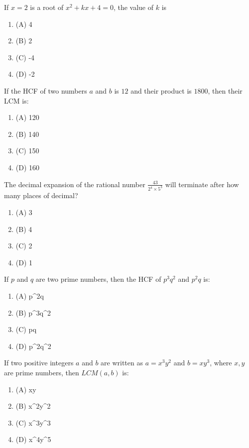\documentclass[12pt,a4paper]{exam}
\begin{document}
\begin{questions}
\question[1] If $x = 2$ is a root of $x^2 + kx + 4 = 0$, the value of $k$ is
\begin{enumerate}[label=(\Alph*)]
  \item (A) 4
  \item (B) 2
  \item (C) -4
  \item (D) -2
\end{enumerate}
\vspace{0.15cm}

\question[1] If the HCF of two numbers $a$ and $b$ is $12$ and their product is $1800$, then their LCM is:
\begin{enumerate}[label=(\Alph*)]
  \item (A) 120
  \item (B) 140
  \item (C) 150
  \item (D) 160
\end{enumerate}
\vspace{0.15cm}

\question[1] The decimal expansion of the rational number $\frac{43}{2^4 \times 5^3}$ will terminate after how many places of decimal?
\begin{enumerate}[label=(\Alph*)]
  \item (A) 3
  \item (B) 4
  \item (C) 2
  \item (D) 1
\end{enumerate}
\vspace{0.15cm}

\question[1] If $p$ and $q$ are two prime numbers, then the HCF of $p^3q^2$ and $p^2q$ is:
\begin{enumerate}[label=(\Alph*)]
  \item (A) p\textasciicircum{}2q
  \item (B) p\textasciicircum{}3q\textasciicircum{}2
  \item (C) pq
  \item (D) p\textasciicircum{}2q\textasciicircum{}2
\end{enumerate}
\vspace{0.15cm}

\question[1] If two positive integers $a$ and $b$ are written as $a = x^3y^2$ and $b = xy^3$, where $x, y$ are prime numbers, then $LCM(a, b)$ is:
\begin{enumerate}[label=(\Alph*)]
  \item (A) xy
  \item (B) x\textasciicircum{}2y\textasciicircum{}2
  \item (C) x\textasciicircum{}3y\textasciicircum{}3
  \item (D) x\textasciicircum{}4y\textasciicircum{}5
\end{enumerate}
\vspace{0.15cm}


\end{questions}
\end{document}
